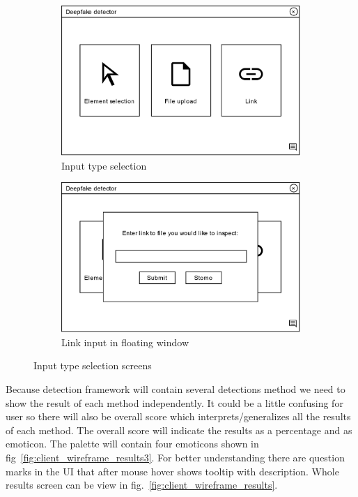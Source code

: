\begin{figure}[H]
    \begin{subfigure}[h]{.498\linewidth}
        \centering
        \includegraphics[width=1\linewidth]{other-fig/client_wireframe_input_selection.png}
        \caption{Input type selection}
    \end{subfigure}
    \hfill
    \begin{subfigure}[h]{.498\linewidth}
        \centering
        \includegraphics[width=1\linewidth]{other-fig/client_wireframe_input_selection2.png}
        \caption{Link input in floating window}
    \end{subfigure}
    \caption{Input type selection screens}
    \label{fig:client_wireframe_input_selection}
\end{figure}

Because detection framework will contain several detections method we need to show the result of each method independently. It could be a little confusing for user so there will also be overall score which interprets/generalizes all the results of each method. The overall score will indicate the results as a percentage and as emoticon. The palette will contain four emoticons shown in fig~\ref{fig:client_wireframe_results3}. For better understanding there are question marks in the UI that after mouse hover shows tooltip with description. Whole results screen can be view in fig.~\ref{fig:client_wireframe_results}.

